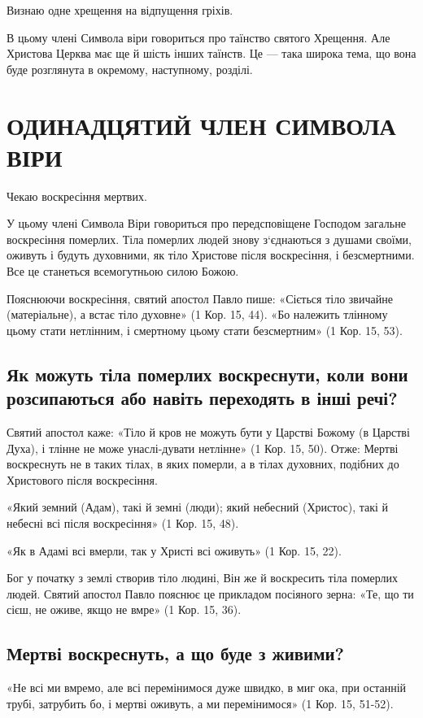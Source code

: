 \documentclass[main.tex]{subfiles}
\begin{document}
Визнаю одне хрещення на відпущення гріхів.

В цьому члені Символа віри говориться про таїнство святого Хрещення. Але Христова Церква має ще й шість інших таїнств. Це — така широка тема, що вона буде розглянута в окремому, наступному, розділі.

\section{ОДИНАДЦЯТИЙ ЧЛЕН СИМВОЛА ВІРИ}

Чекаю воскресіння мертвих.

У цьому члені Символа Віри говориться про передсповіщене Господом загальне воскресіння померлих. Тіла померлих людей знову з`єднаються з душами своїми, оживуть і будуть духовними, як тіло Христове після воскресіння, і безсмертними. Все це станеться всемогутньою силою Божою.

Пояснюючи воскресіння, святий апостол Павло пише: «Сіється тіло звичайне (матеріальне), а встає тіло духовне» (1 Кор. 15, 44).
«Бо належить тлінному цьому стати нетлінним, і смертному цьому стати безсмертним» (1 Кор. 15, 53).
 
\subsection{Як можуть тіла померлих воскреснути, коли вони розсипаються або навіть переходять в інші речі?}

Святий апостол каже: «Тіло й кров не можуть бути у Царстві Божому (в Царстві Духа), і тлінне не може унаслі-дувати нетлінне» (1 Кор. 15, 50). Отже:
Мертві воскреснуть не в таких тілах, в яких померли, а в тілах духовних, подібних до Христового після воскресіння.

«Який земний (Адам), такі й земні (люди); який небесний (Христос), такі й небесні всі після воскресіння» (1 Кор. 15, 48).

«Як в Адамі всі вмерли, так у Христі всі оживуть» (1 Кор. 15, 22).

Бог у початку з землі створив тіло людині, Він же й воскресить тіла померлих людей. Святий апостол Павло пояснює це прикладом посіяного зерна: «Те, що ти сієш, не оживе, якщо не вмре» (1 Кор. 15, 36).

\subsection{Мертві воскреснуть, а що буде з живими?}

«Не всі ми вмремо, але всі перемінимося дуже швидко, в миг ока, при останній трубі, затрубить бо, і мертві оживуть, а ми перемінимося» (1 Кор. 15, 51-52).
\end{document}
